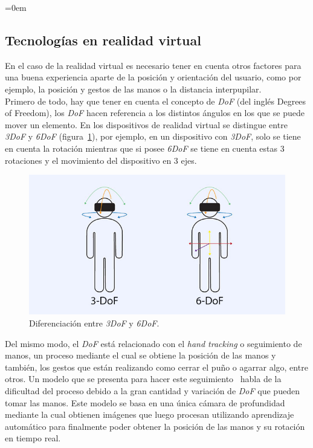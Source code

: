 \parindent=0em
\subsection{Tecnologías en realidad virtual}
\noindent

En el caso de la realidad virtual es necesario tener en cuenta otros factores para una buena experiencia aparte de la posición y orientación del usuario, como por ejemplo, la posición y gestos de las manos o la distancia interpupilar.\\

Primero de todo, hay que tener en cuenta el concepto de \textit{DoF} (del inglés Degrees of Freedom), los \textit{DoF} hacen referencia a los distintos ángulos en los que se puede mover un elemento. En los dispositivos de realidad virtual se distingue entre \textit{3DoF} y \textit{6DoF} (figura~\ref{fig:3dofvs6dof}), por ejemplo, en un dispositivo con \textit{3DoF}, solo se tiene en cuenta la rotación mientras que si posee \textit{6DoF} se tiene en cuenta estas 3 rotaciones y el movimiento del dispositivo en 3 ejes.\\

\begin{figure}[H]
    \centering
    \includegraphics[scale=0.6]{Images/Estado del arte/3dofvs6dof.jpg}
    \caption{Diferenciación entre \textit{3DoF} y \textit{6DoF}.}
    \label{fig:3dofvs6dof}
\end{figure}



Del mismo modo, el \textit{DoF} está relacionado con el \textit{hand tracking} o seguimiento de manos, un proceso mediante el cual se obtiene la posición de las manos y también, los gestos que están realizando como cerrar el puño o agarrar algo, entre otros. Un modelo que se presenta para hacer este seguimiento~\cite{robustHandTracking} habla de la dificultad del proceso debido a la gran cantidad y variación de \textit{DoF} que pueden tomar las manos. Este modelo se basa en una única cámara de profundidad mediante la cual obtienen imágenes que luego procesan utilizando aprendizaje automático para finalmente poder obtener la posición de las manos y su rotación en tiempo real.\\

